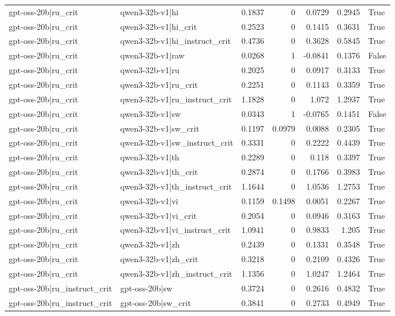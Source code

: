 \begin{table}
\begin{tabular}{l l r r r r l}
gpt-oss-20b|ru_crit & qwen3-32b-v1|hi & 0.1837 & 0 & 0.0729 & 0.2945 & True \\
gpt-oss-20b|ru_crit & qwen3-32b-v1|hi_crit & 0.2523 & 0 & 0.1415 & 0.3631 & True \\
gpt-oss-20b|ru_crit & qwen3-32b-v1|hi_instruct_crit & 0.4736 & 0 & 0.3628 & 0.5845 & True \\
gpt-oss-20b|ru_crit & qwen3-32b-v1|raw & 0.0268 & 1 & -0.0841 & 0.1376 & False \\
gpt-oss-20b|ru_crit & qwen3-32b-v1|ru & 0.2025 & 0 & 0.0917 & 0.3133 & True \\
gpt-oss-20b|ru_crit & qwen3-32b-v1|ru_crit & 0.2251 & 0 & 0.1143 & 0.3359 & True \\
gpt-oss-20b|ru_crit & qwen3-32b-v1|ru_instruct_crit & 1.1828 & 0 & 1.072 & 1.2937 & True \\
gpt-oss-20b|ru_crit & qwen3-32b-v1|sw & 0.0343 & 1 & -0.0765 & 0.1451 & False \\
gpt-oss-20b|ru_crit & qwen3-32b-v1|sw_crit & 0.1197 & 0.0979 & 0.0088 & 0.2305 & True \\
gpt-oss-20b|ru_crit & qwen3-32b-v1|sw_instruct_crit & 0.3331 & 0 & 0.2222 & 0.4439 & True \\
gpt-oss-20b|ru_crit & qwen3-32b-v1|th & 0.2289 & 0 & 0.118 & 0.3397 & True \\
gpt-oss-20b|ru_crit & qwen3-32b-v1|th_crit & 0.2874 & 0 & 0.1766 & 0.3983 & True \\
gpt-oss-20b|ru_crit & qwen3-32b-v1|th_instruct_crit & 1.1644 & 0 & 1.0536 & 1.2753 & True \\
gpt-oss-20b|ru_crit & qwen3-32b-v1|vi & 0.1159 & 0.1498 & 0.0051 & 0.2267 & True \\
gpt-oss-20b|ru_crit & qwen3-32b-v1|vi_crit & 0.2054 & 0 & 0.0946 & 0.3163 & True \\
gpt-oss-20b|ru_crit & qwen3-32b-v1|vi_instruct_crit & 1.0941 & 0 & 0.9833 & 1.205 & True \\
gpt-oss-20b|ru_crit & qwen3-32b-v1|zh & 0.2439 & 0 & 0.1331 & 0.3548 & True \\
gpt-oss-20b|ru_crit & qwen3-32b-v1|zh_crit & 0.3218 & 0 & 0.2109 & 0.4326 & True \\
gpt-oss-20b|ru_crit & qwen3-32b-v1|zh_instruct_crit & 1.1356 & 0 & 1.0247 & 1.2464 & True \\
gpt-oss-20b|ru_instruct_crit & gpt-oss-20b|sw & 0.3724 & 0 & 0.2616 & 0.4832 & True \\
gpt-oss-20b|ru_instruct_crit & gpt-oss-20b|sw_crit & 0.3841 & 0 & 0.2733 & 0.4949 & True \\

\end{tabular}
\end{table}
